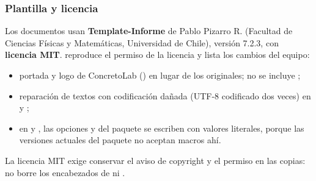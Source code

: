 \subsubsection{Plantilla y licencia}

Los documentos usan \textbf{Template-Informe} de Pablo Pizarro R. (Facultad de Ciencias Físicas y Matemáticas,
Universidad de Chile), versión 7.2.3, con \textbf{licencia MIT}.  reproduce el
permiso de la licencia y lista los cambios del equipo:

\begin{itemize}
	\item portada y logo de ConcretoLab () en lugar de los originales; no se incluye
	      ;
	\item reparación de textos con codificación dañada (UTF-8 codificado dos veces) en  y ;
	\item en  y , las opciones  y
	       del paquete  se escriben con valores literales, porque las versiones actuales
	      del paquete no aceptan macros ahí.
\end{itemize}

La licencia MIT exige conservar el aviso de copyright y el permiso en las copias: no borre los encabezados de
 ni .
